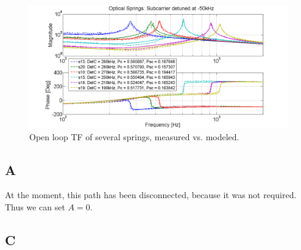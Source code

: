 \begin{figure}[htbb]
\includegraphics[width=343pt]{figures/controls/OLG.png}%
\caption{Open loop TF of several springs, measured vs. modeled.}%
\label{fig:OLG}%
\end{figure}




\subsection{A}

At the moment, this path has been disconnected, because it was not required.  Thus we can set $A=0$.

%

\subsection{C}

